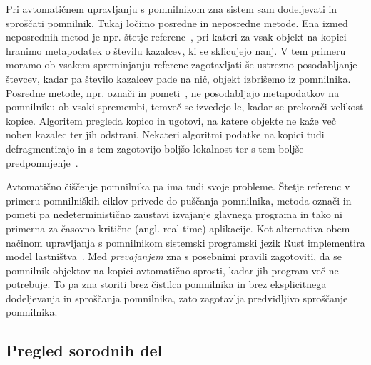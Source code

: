 \documentclass[a4paper, 12pt]{article}
\begin{document}
Pri avtomatičnem upravljanju s pomnilnikom zna sistem sam dodeljevati in sproščati pomnilnik. Tukaj ločimo posredne in neposredne metode. Ena izmed neposrednih metod je npr. štetje referenc~\cite{collins1960method}, pri kateri za vsak objekt na kopici hranimo metapodatek o številu kazalcev, ki se sklicujejo nanj. V tem primeru moramo ob vsakem spreminjanju referenc zagotavljati še ustrezno posodabljanje števcev, kadar pa število kazalcev pade na nič, objekt izbrišemo iz pomnilnika. Posredne metode, npr. označi in pometi~\cite{mccarthy1960recursive}, ne posodabljajo metapodatkov na pomnilniku ob vsaki spremembi, temveč se izvedejo le, kadar se prekorači velikost kopice. Algoritem pregleda kopico in ugotovi, na katere objekte ne kaže več noben kazalec ter jih odstrani. Nekateri algoritmi podatke na kopici tudi defragmentirajo in s tem zagotovijo boljšo lokalnost ter s tem boljše predpomnjenje~\cite{fenichel1969lisp}. 

Avtomatično čiščenje pomnilnika pa ima tudi svoje probleme. Štetje referenc v primeru pomnilniških ciklov privede do puščanja pomnilnika, metoda označi in pometi pa nedeterministično zaustavi izvajanje glavnega programa in tako ni primerna za časovno-kritične (angl. real-time) aplikacije. Kot alternativa obem načinom upravljanja s pomnilnikom sistemski programski jezik Rust implementira model lastništva~\cite{klabnik2023rust}. Med \textit{prevajanjem} zna s posebnimi pravili zagotoviti, da se pomnilnik objektov na kopici avtomatično sprosti, kadar jih program več ne potrebuje. To pa zna storiti brez čistilca pomnilnika in brez eksplicitnega dodeljevanja in sproščanja pomnilnika, zato zagotavlja predvidljivo sproščanje pomnilnika.


\subsection{Pregled sorodnih del}

\end{document}
